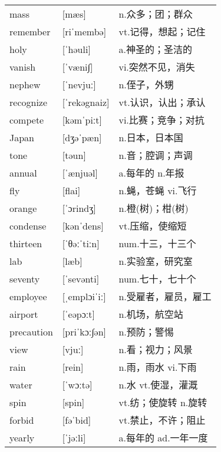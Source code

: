 \documentclass[a4paper]{article}
\begin{document}
\section{}
\begin{tabular}{l l l}

mass & [mæs] & n.众多；团；群众 \\
remember & [riˈmembə] & vt.记得，想起；记住 \\
holy & [ˈhəuli] & a.神圣的；圣洁的 \\
vanish & [ˈvæni∫] & vi.突然不见，消失 \\
nephew & [ˈnevjuː] & n.侄子，外甥 \\
recognize & [ˈrekəgnaiz] & vt.认识，认出；承认 \\
compete & [kəmˈpiːt] & vi.比赛；竞争；对抗 \\
Japan & [dʒəˈpæn] & n.日本，日本国 \\
tone & [təun] & n.音；腔调；声调 \\
annual & [ˈænjuəl] & a.每年的 n.年报 \\
fly & [flai] & n.蝇，苍蝇 vi.飞行 \\
orange & [ˈɔrindʒ] & n.橙(树)；柑(树) \\
condense & [kənˈdens] & vt.压缩，使缩短 \\
thirteen & [ˈθəːˈtiːn] & num.十三，十三个 \\
lab & [læb] & n.实验室，研究室 \\
seventy & [ˈsevənti] & num.七十，七十个 \\
employee & [ˌemplɔiˈiː] & n.受雇者，雇员，雇工 \\
airport & [ˈeəpɔːt] & n.机场，航空站 \\
precaution & [priˈkɔː∫ən] & n.预防；警惕 \\
view & [vjuː] & n.看；视力；风景 \\
rain & [rein] & n.雨，雨水 vi.下雨 \\
water & [ˈwɔːtə] & n.水 vt.使湿，灌溉 \\
spin & [spin] & vt.纺；使旋转 n.旋转 \\
forbid & [fəˈbid] & vt.禁止，不许；阻止 \\
yearly & [ˈjəːli] & a.每年的 ad.一年一度 \\

\end{tabular}
\end{document}
